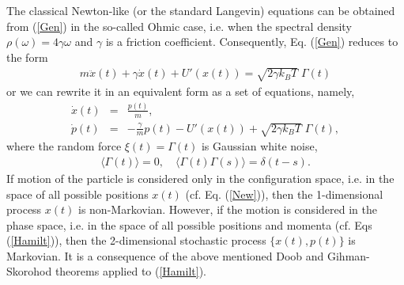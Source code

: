 \documentclass[authoryear,draft,1p,times]{elsarticle}
\renewcommand{\=}{\stackrel{\mathrm{d}}{=}}
\begin{document}
The classical Newton-like (or the standard Langevin) equations  can be 
obtained from (\ref{Gen}) in the so-called 
Ohmic case, i.e. when the spectral density $\rho(\omega)=4\gamma \omega$
and  $\gamma$ is a friction coefficient.  
 Consequently, Eq. (\ref{Gen}) reduces to the form 
%
\begin{eqnarray}
\label{New}
m\ddot x(t) +  \gamma \dot x(t) + U'(x(t))= \sqrt{2\gamma k_BT}\;\Gamma(t)
\end{eqnarray}
%
or  we can rewrite it in an equivalent form as a set of equations, namely, 
%
\begin{eqnarray}
\label{Hamilt}
\dot x(t) &=& \frac{p(t)}{m}, \nonumber\\
\dot p(t) &=& -\frac{\gamma}{m} p(t) - U'(x(t))
+ \sqrt{2\gamma k_BT}\; \Gamma(t),
\end{eqnarray}
%
where the random force $\xi(t) =\Gamma(t)$ is Gaussian white noise, 
%
\begin{eqnarray}
\label{white}
\langle \Gamma(t)\rangle = 0, \quad
\langle \Gamma(t) \Gamma(s)\rangle =  \delta(t-s).
\end{eqnarray} 
%
If  motion of the particle is considered only in the configuration space, 
i.e. in the space of all possible positions $x(t)$ (cf. Eq. (\ref{New})), 
then the 1-dimensional 
process $x(t)$ is 
non-Markovian. However, if the motion is considered in the phase space, 
i.e. in the space of all possible positions and momenta 
(cf.  Eqs (\ref{Hamilt})),  
then the 2-dimensional stochastic process $\{x(t), p(t)\}$ is Markovian. 
It is a consequence of the above mentioned Doob and Gihman-Skorohod theorems 
 \cite{doob,gih} applied to (\ref{Hamilt}). 
\end{document}
